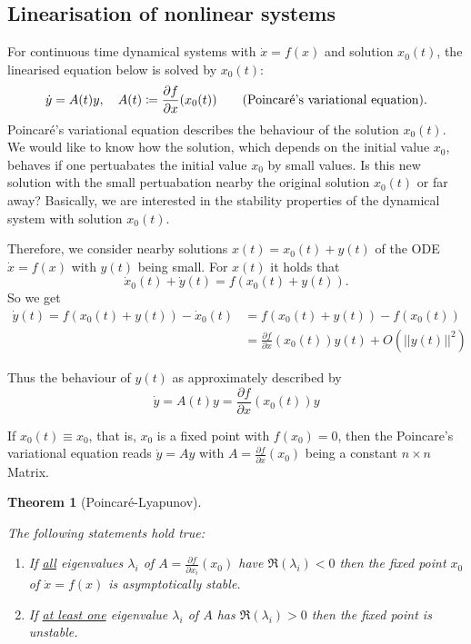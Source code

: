 \documentclass[hidelinks,a4paper, 11pt]{article}
\theoremstyle{plain}
\newtheorem{theorem}{Theorem}
\theoremstyle{break}
\theoremstyle{plain}
\theoremstyle{definition}
\begin{document}
\subsection{Linearisation of nonlinear systems}

For continuous time dynamical systems with $\dot x = f(x)$ and solution $x_0(t)$, the linearised equation below is solved by $x_0(t)$:
\[
	\dot y = A(t)y, \quad A(t) \coloneqq \frac{\partial f}{\partial x}(x_0(t)) \tag{\text{Poincaré's variational equation}}.                                                                                
\]
Poincaré's variational equation describes the behaviour of the solution $x_0(t)$. We would like to know how the solution, which depends on the initial value $x_0$, behaves if one pertuabates the initial value $x_0$ by small values. Is this new solution with the small pertuabation nearby the original solution $x_0(t)$ or far away?  Basically, we are interested in the stability properties of the dynamical system with solution $x_0(t)$.

Therefore, we consider nearby solutions $x(t) = x_0(t) + y(t)$ of the ODE $\dot x = f(x)$ with $y(t)$ being small. For $x(t)$ it holds that
\[
	\dot x_0(t) + \dot y(t) = f(x_0(t) +y(t)).
\]
So we get 
\begin{align*}
	\dot y(t) = f(x_0(t) + y(t)) - \dot x_0(t) &= f(x_0(t) + y(t)) - f(x_0(t))\\
	&= \frac{\partial f}{\partial x}(x_0(t))y(t) + O(||y(t)||^2)
\end{align*}

Thus the behaviour of $y(t)$ as approximately described by 
\[
	\dot y = A(t)y = \frac{\partial f}{\partial x}(x_0(t))y
\]

If $x_0(t) \equiv x_0$, that is, $x_0$ is a fixed point with $f(x_0) = 0$, then the Poincare's variational equation reads $\dot y = Ay$ with $A = \frac{\partial f}{\partial x}(x_0)$ being a constant $n \times n$ Matrix.


\begin{theorem}[Poincaré-Lyapunov]\label{theorem:poincare-lyapunov}
	\begin{framed}
	The following statements hold true:
	\begin{enumerate}
		\item If \underline{all} eigenvalues $\lambda_i$ of $A = \frac{\partial f}{\partial x_i}(x_0)$ have $\Re(\lambda_i) < 0$ then the fixed point $x_0$ of $\dot x = f(x)$ is asymptotically stable.
		
		\item If \underline{at least one} eigenvalue $\lambda_i$ of $A$ has $\Re(\lambda_i) > 0$ then the fixed point is unstable.
	\end{enumerate}
\end{framed}
\end{theorem}
\end{document}
